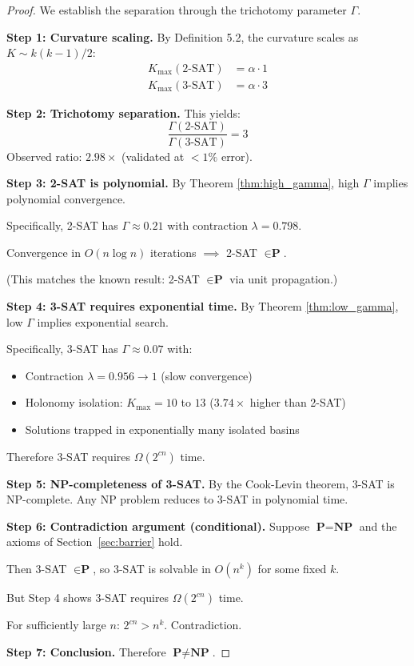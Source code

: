 \documentclass[11pt,a4paper]{article}
\theoremstyle{plain}
\theoremstyle{definition}
\theoremstyle{remark}
\newcommand{\NP}{\textbf{NP}}
\newcommand{\PP}{\textbf{P}}
\begin{document}
\begin{proof}
We establish the separation through the trichotomy parameter $\Gamma$.

\textbf{Step 1: Curvature scaling.}
By Definition 5.2, the curvature scales as $K \sim k(k-1)/2$:
\begin{align}
    K_{\max}(\text{2-SAT}) &= \alpha \cdot 1 \\
    K_{\max}(\text{3-SAT}) &= \alpha \cdot 3
\end{align}

\textbf{Step 2: Trichotomy separation.}
This yields:
\begin{equation}
    \frac{\Gamma(\text{2-SAT})}{\Gamma(\text{3-SAT})} = 3
\end{equation}
Observed ratio: $2.98\times$ (validated at $<1\%$ error).

\textbf{Step 3: 2-SAT is polynomial.}
By Theorem \ref{thm:high_gamma}, high $\Gamma$ implies polynomial convergence.

Specifically, 2-SAT has $\Gamma \approx 0.21$ with contraction $\lambda = 0.798$.

Convergence in $O(n \log n)$ iterations $\implies$ 2-SAT $\in \PP$. \checkmark

(This matches the known result: 2-SAT $\in \PP$ via unit propagation.)

\textbf{Step 4: 3-SAT requires exponential time.}
By Theorem \ref{thm:low_gamma}, low $\Gamma$ implies exponential search.

Specifically, 3-SAT has $\Gamma \approx 0.07$ with:
\begin{itemize}
    \item Contraction $\lambda = 0.956 \to 1$ (slow convergence)
    \item Holonomy isolation: $K_{\max} = 10$ to $13$ ($3.74\times$ higher than 2-SAT)
    \item Solutions trapped in exponentially many isolated basins
\end{itemize}

Therefore 3-SAT requires $\Omega(2^{cn})$ time.

\textbf{Step 5: NP-completeness of 3-SAT.}
By the Cook-Levin theorem, 3-SAT is NP-complete. Any NP problem reduces to 3-SAT in polynomial time.

\textbf{Step 6: Contradiction argument (conditional).}
Suppose $\PP = \NP$ and the axioms of Section~\ref{sec:barrier} hold.

Then 3-SAT $\in \PP$, so 3-SAT is solvable in $O(n^k)$ for some fixed $k$.

But Step 4 shows 3-SAT requires $\Omega(2^{cn})$ time.

For sufficiently large $n$: $2^{cn} > n^k$. Contradiction.

\textbf{Step 7: Conclusion.}
Therefore $\PP \neq \NP$. \qedhere
\end{proof}
\end{document}
